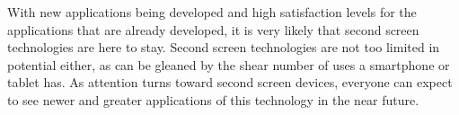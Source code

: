 \documentclass[11pt, oneside]{article}
\begin{document}
With new applications being developed and high satisfaction levels for the applications that are already developed, it is very likely that second screen technologies are here to stay. Second screen technologies are not too limited in potential either, as can be gleaned by the shear number of uses a smartphone or tablet has. As attention turns toward second screen devices, everyone can expect to see newer and greater applications of this technology in the near future.

{}

\end{document}

